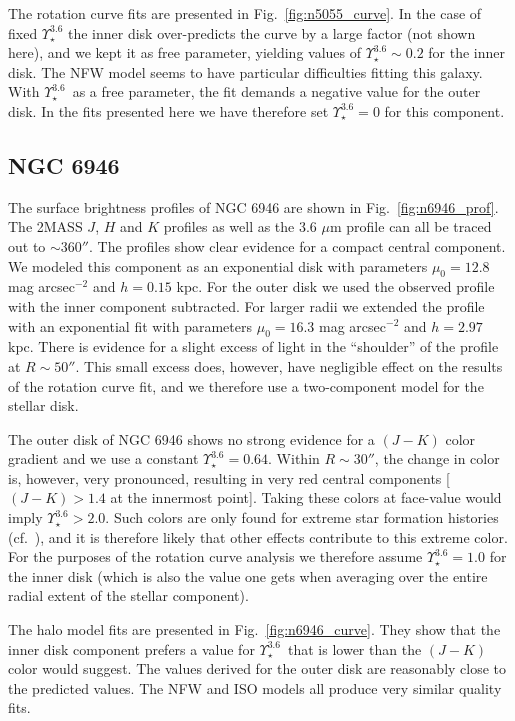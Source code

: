 \documentclass[usenatbib,usegraphicx,apjfonts,floatfix]{emulateapj}
\newcommand{\Ups}{\ensuremath{\Upsilon_{\star}^{3.6}}}
\begin{document}
The rotation curve fits are presented in Fig.~\ref{fig:n5055_curve}.
In the case of fixed $\Ups$ the inner disk over-predicts the curve by a
large factor (not shown here), and we kept it as free parameter,
yielding values of $\Ups \sim 0.2$ for the inner disk.  The NFW model
seems to have particular difficulties fitting this galaxy. With \Ups\
as a free parameter, the fit demands a negative value for the outer
disk. In the fits presented here we have therefore set $\Ups = 0$ for
this component.

\subsection{NGC 6946}

The surface brightness profiles of NGC 6946 are shown in
Fig.~\ref{fig:n6946_prof}. The 2MASS $J$, $H$ and $K$ profiles as well
as the 3.6 $\mu$m profile can all be traced out to $\sim 360''$.  The
profiles show clear evidence for a compact central component.  We
modeled this component as an exponential disk with parameters $\mu_0 =
12.8$ mag arcsec$^{-2}$ and $h=0.15$ kpc.  For the outer disk we used
the observed profile with the inner component subtracted. For larger
radii we extended the profile with an exponential fit with parameters
$\mu_0 = 16.3$ mag arcsec$^{-2}$ and $h=2.97$ kpc. There is evidence
for a slight excess of light in the ``shoulder'' of the profile at
$R\sim 50''$. This small excess does, however, have negligible effect
on the results of the rotation curve fit, and we therefore use a
two-component model for the stellar disk.

The outer disk of NGC 6946 shows no strong evidence for a $(J-K)$
color gradient and we use a constant $\Ups = 0.64$.  Within $R \sim
30''$, the change in color is, however, very pronounced, resulting in
very red central components [$(J-K)>1.4$ at the innermost
point]. Taking these colors at face-value would imply $\Ups >
2.0$. Such colors are only found for extreme star formation histories
(cf.\ \citealt{oh2007}), and it is therefore likely that other effects
contribute to this extreme color. For the purposes of the rotation
curve analysis we therefore assume $\Ups=1.0$ for the inner disk
(which is also the value one gets when averaging over the entire
radial extent of the stellar component).

The halo model fits are presented in Fig.~\ref{fig:n6946_curve}.  They
show that the inner disk component prefers a value for \Ups\ that is
lower than the $(J-K)$ color would suggest. The values derived for
the outer disk are reasonably close to the predicted values.  The NFW
and ISO models all produce very similar quality fits.
\end{document}
